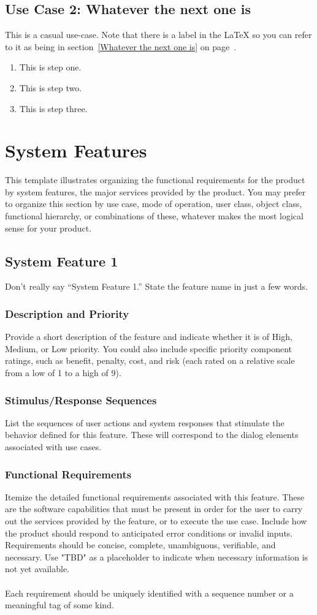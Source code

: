 \documentclass[12pt,oneside,letterpaper]{article}
\begin{document}
\subsection{\label{Whatever the next one is}Use Case 2: Whatever the next one is}
This is a casual use-case.  Note that there is a label in the LaTeX so you can refer
to it as being in section~\ref{Whatever the next one is} on page~\pageref{Whatever the next one is}.
\begin{enumerate}
\item This is step one.
\item This is step two.
\item This is step three.
\end{enumerate}

\section{System Features}
This template illustrates organizing the functional requirements for the product by system features, the major services provided by the product. You may prefer to organize this section by use case, mode of operation, user class, object class, functional hierarchy, or combinations of these, whatever makes the most logical sense for your product.
\subsection{System Feature 1}
Don't really say ``System Feature 1.'' State the feature name in just a few words.
\subsubsection{Description and Priority}
Provide a short description of the feature and indicate whether it is of High, Medium, or Low priority. You could also include specific priority component ratings, such as benefit, penalty, cost, and risk (each rated on a relative scale from a low of 1 to a high of 9).
\subsubsection{Stimulus/Response Sequences}
List the sequences of user actions and system responses that stimulate the behavior defined for this feature. These will correspond to the dialog elements associated with use cases.
\subsubsection{Functional Requirements}
Itemize the detailed functional requirements associated with this feature. These are the software capabilities that must be present in order for the user to carry out the services provided by the feature, or to execute the use case. Include how the product should respond to anticipated error conditions or invalid inputs. Requirements should be concise, complete, unambiguous, verifiable, and necessary. Use "TBD" as a placeholder to indicate when necessary information is not yet available.\\
\\
Each requirement should be uniquely identified with a sequence number or a meaningful tag of some kind.
\end{document}
